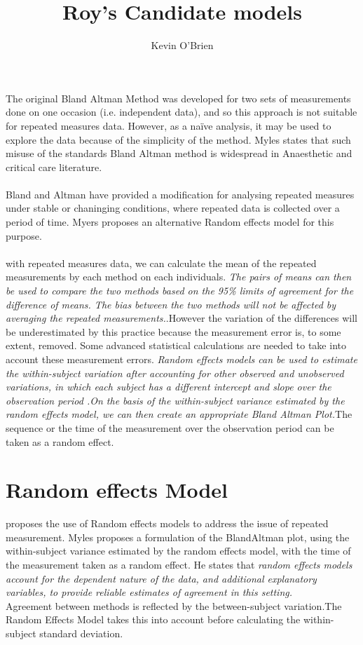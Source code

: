 	\author{Kevin O'Brien}
	\title{Roy's Candidate models}
	The original Bland Altman Method was developed for two sets of
	measurements done on one occasion (i.e. independent data), and so
	this approach is not suitable for repeated measures data. However,
	as a naïve analysis, it may be used to explore the data because of
	the simplicity of the method. Myles states that such misuse of the
	standards Bland Altman method is widespread in Anaesthetic and
	critical care literature.
	\\
	\\
	Bland and Altman have provided a modification for analysing
	repeated measures under stable or chaninging conditions, where
	repeated data is collected over a period of time. Myers proposes
	an alternative Random effects model for this purpose.
	\\
	\\
	with repeated measures data, we can
	calculate the mean of the repeated measurements by each method on
	each individuals. \emph{ The pairs of means can then be used to
		compare the two methods based on the 95\% limits of agreement for
		the difference of means. The bias between the two methods will not
		be affected by averaging the repeated measurements.}.However the
	variation of the differences will be underestimated by this
	practice because the measurement error is, to some extent,
	removed. Some advanced statistical calculations are needed to take
	into account these measurement errors. \emph{Random effects models
		can be used to estimate the within-subject variation after
		accounting for other observed and unobserved variations, in which
		each subject has a different intercept and slope over the
		observation period .On the basis of the within-subject variance
		estimated by the random effects model, we can then create an
		appropriate Bland Altman Plot.}The sequence or the time of the
	measurement over the observation period can be taken as a random
	effect.
	\section{Random effects Model} \citet{Myles} proposes the use of
	Random effects models to address the issue of repeated
	measurement. Myles proposes a formulation of the BlandAltman
	plot, using the within-subject variance estimated by the random
	effects model, with the time of the measurement taken as a random
	effect. He states that \emph{random effects models account for the
		dependent nature of the data, and additional explanatory
		variables, to provide reliable estimates of agreement in this
		setting.}
	\\
	Agreement between methods is reflected by the between-subject
	variation.The Random Effects Model takes this into account before
	calculating the within-subject standard deviation.

